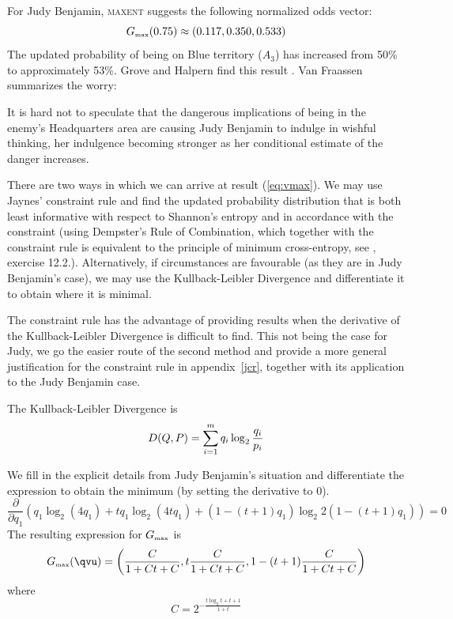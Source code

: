 For Judy Benjamin, \textsc{maxent} suggests the following normalized
odds vector:
\begin{equation}
  \label{eq:vmax}
  G_{\mbox{{\tiny max}}}(0.75)\approx(0.117,0.350,0.533)
\end{equation}
The updated probability of being on Blue territory ($A_{3}$) has
increased from 50\% to approximately 53\%. Grove and Halpern find this
result  .
Van Fraassen summarizes the worry:
\begin{quotex}
  It is hard not to speculate that the dangerous implications of being
  in the enemy's Headquarters area are causing Judy Benjamin to
  indulge in wishful thinking, her indulgence becoming stronger as her
  conditional estimate of the danger increases. 
\end{quotex}

\bigskip

\nial There are two ways in which we can arrive at result
({\ref{eq:vmax}}). We may use Jaynes' constraint rule and find the
updated probability distribution that is both least informative with
respect to Shannon's entropy and in accordance with the constraint
(using Dempster's Rule of Combination, which together with the
constraint rule is equivalent to the principle of minimum
cross-entropy, see , exercise 12.2.).
Alternatively, if circumstances are favourable (as they are in Judy
Benjamin's case), we may use the Kullback-Leibler Divergence and
differentiate it to obtain where it is minimal.


The constraint rule has the advantage of providing results when the
derivative of the Kullback-Leibler Divergence is difficult to find.
This not being the case for Judy, we go the easier route of the second
method and provide a more general justification for the constraint
rule in appendix~\ref{jcr}, together with its application to the Judy
Benjamin case.

The Kullback-Leibler Divergence is
\begin{equation}
  D(Q,P)=\sum_{i=1}^{m}q_{i}\log_{2}\frac{q_{i}}{p_{i}}\notag
\end{equation}

We fill in the explicit details from Judy Benjamin's situation and
differentiate the expression to obtain the minimum (by setting the
derivative to $0$). 
\begin{displaymath}
\frac{\partial}{\partial{}q_{1}}(q_{1}\log_{2}(4q_{1})+tq_{1}\log_{2}(4tq_{1})+(1-(t+1)q_{1})\log_{2}2(1-(t+1)q_{1}))=0
\end{displaymath}
The resulting expression for $G_{\mbox{\tiny max}}$ is
\begin{displaymath}
  G_{\mbox{\tiny max}}({\qvu})=\left(\frac{C}{1+Ct+C},t\frac{C}{1+Ct+C},1-(t+1)\frac{C}{1+Ct+C}\right)
\end{displaymath}
where
\begin{displaymath}
  C=2^{-\frac{t\log_{2}t+t+1}{1+t}}
\end{displaymath}

